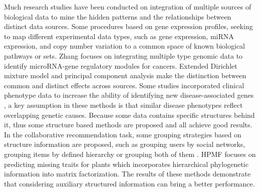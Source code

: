 \documentclass{bmcart}
\begin{document}
Much research studies have been conducted on integration of multiple sources of biological data to mine the hidden patterns and the relationships between distinct data sources. Some procedures based on gene expression profiles, seeking to map different experimental data types, such as gene expression, miRNA expression, and copy number variation to a common space of known biological pathways or sets\cite{Khatri2012,Mitrea2013}. Zhang\cite{Zhang2011} focuses on integrating multiple type genomic data to identify microRNA-gene regulatory modules for cancers. Extended Dirichlet mixture model\cite{Lock2013} and principal component analysis\cite{Lock2013a} make the distinction between common and distinct effects across sources. Some studies incorporated clinical phenotype data to increase the ability of identifying new disease-associated genes\cite{Hwang2012,Lage2007,Li2010,Vanunu2010,Wu2008a,Wu2008b}
, a key assumption in these methods is that similar disease phenotypes reflect overlapping genetic causes\cite{Houle2010}.
 Because some data contains specific structures behind it, thus some structure based methods are proposed and all achieve good results. In the collaborative recommendation task, some grouping strategies based on structure information are proposed, such as grouping users by social networks, grouping items by defined hierarchy or grouping both of them \cite{Wang2014,Ma2008,AliMashhoori2012}. HPMF\cite{Shan2012} focuses on predicting missing traits for plants which incorporates hierarchical phylogenetic information into matrix factorization. The results of these methods demonstrate that considering auxiliary structured information can bring a better performance.
\end{document}

